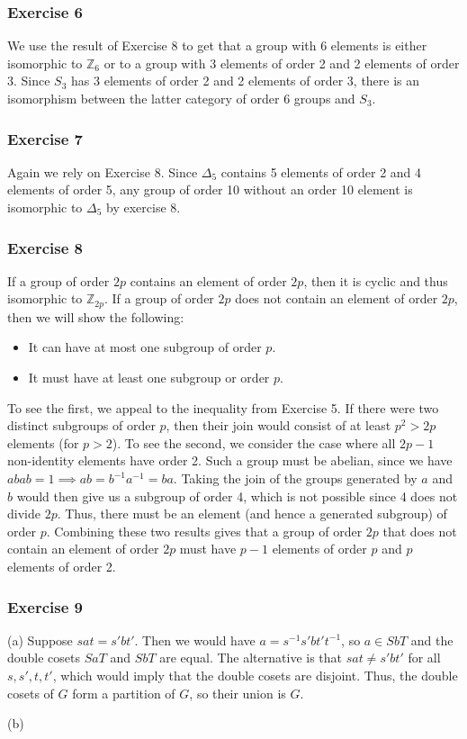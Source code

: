 \subsubsection{Exercise 6}
We use the result of Exercise 8 to get that a group with 6 elements is either isomorphic to $\mathbb{Z}_6$ or
to a group with 3 elements of order 2 and 2 elements of order 3. Since $S_3$ has 3 elements of order 2 and
2 elements of order 3, there is an isomorphism between the latter category of order 6 groups and $S_3$.

\subsubsection{Exercise 7}
Again we rely on Exercise 8. Since $\Delta_5$ contains 5 elements of order 2 and 4 elements of order 5,
any group of order 10 without an order 10 element is isomorphic to $\Delta_5$ by exercise 8.

\subsubsection{Exercise 8}
If a group of order $2p$ contains an element of order $2p$, then it is cyclic and thus isomorphic to
$\mathbb{Z}_{2p}$. If a group of order $2p$ does not contain an element of order $2p$, then we will show
the following:
\begin{itemize}
  \item It can have at most one subgroup of order $p$.
  \item It must have at least one subgroup or order $p$.
\end{itemize}
To see the first, we appeal to the inequality from Exercise 5. If there were two distinct subgroups of order
$p$, then their join would consist of at least $p^2 > 2p$ elements (for $p > 2$). To see the second, we 
consider the case where all  $2p - 1$ non-identity elements have order 2. Such a group must be abelian,
since we have $abab = 1 \implies ab = b^{-1} a^{-1} = ba$. Taking the join of the groups generated by $a$ 
and $b$ would then give us a subgroup of order 4, which is not possible since 4 does not divide $2p$. Thus,
there must be an element (and hence a generated subgroup) of order $p$. Combining these two results gives
that a group of order $2p$ that does not contain an element of order $2p$ must have $p-1$ elements of order
$p$ and $p$ elements of order 2.

\subsubsection{Exercise 9}
(a) Suppose $s a t = s' b t'$. Then we would have  $a = s^{-1} s' b t' t^{-1}$, so $a \in SbT$ and the 
double cosets $SaT$ and $SbT$ are equal. The alternative is that $s a t \neq s' b t'$ for all $s, s', t, t'$,
which would imply that the double cosets are disjoint. Thus, the double cosets of $G$ form a partition of
$G$, so their union is $G$.

(b) 
